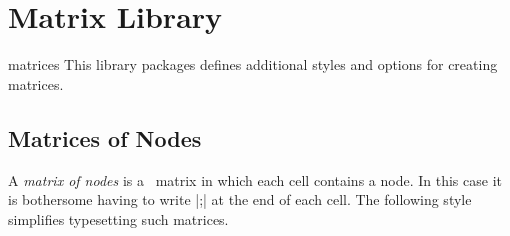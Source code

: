 %
%
%


\section{Matrix Library}

\begin{tikzlibrary}{matrices}
  This library packages defines additional styles and options for
  creating matrices.
\end{tikzlibrary}


\subsection{Matrices of Nodes}

A \emph{matrix of nodes} is a \tikzname\ matrix in which each cell
contains a node. In this case it is bothersome having to write
|;| at the end of each
cell. The following style simplifies typesetting such matrices.

